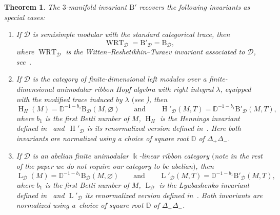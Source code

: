 \documentclass[10pt,a4paper]{amsart}
\newtheorem{theorem}{Theorem}
\numberwithin{equation}{section}
\numberwithin{theorem}{section}
\numberwithin{proposition}{section}
\numberwithin{definition}{section}
\numberwithin{lemma}{section}
\numberwithin{corollary}{section}
\numberwithin{remark}{section}
\numberwithin{example}{section}
\newcommand{\catd}{\mathcal{D}}
\newcommand{\FK}{{\Bbbk}}
\newcommand{\ThreeManInv}{\mathrm{B}}
\begin{document}
\begin{theorem} The $3$-manifold invariant $\ThreeManInv'$ recovers the following invariants as special cases:
 \begin{enumerate}\itemsep=0pt
 \item[$1.$] If $\catd$ is semisimple modular with the standard categorical trace, then
 \[\operatorname{WRT}_\catd=\ThreeManInv'_\catd=\ThreeManInv_\catd,\]
 where $\operatorname{WRT}_\catd$ is the Witten--Reshetikhin--Turaev
 invariant associated to $\catd$, see~{\rm \cite{RT, Tu}}.
 \item[$2.$] If $\catd$ is the category of finite-dimensional left
modules over a finite-dimensional unimodular ribbon Hopf algebra with right integral
$\lambda$, equipped with the modified trace induced by $\lambda$ $($see
{\rm\cite[{\it Theorem} 1]{BBG17b})}, then
\[
\operatorname{H}_H(M)=\mathbb{D}^{-1-b_1}\ThreeManInv_\catd(M,\varnothing) \qquad \text{and}\qquad \operatorname{H}'_\catd(M,T) =\mathbb{D}^{-1-b_1}\ThreeManInv'_\catd(M,T),
\]
where
$b_1$ is the first Betti number of $M$, $\operatorname{H}_H$ is the Hennings invariant defined in~{\rm \cite{H96}} and~$\operatorname{H}'_\catd$ is its renormalized version defined in~{\rm \cite{DRGPM18}}. Here both invariants are normalized using a choice of square root $\mathbb{D}$ of $\Delta_+\Delta_-$.
\item[$3.$] If $\catd$ is an abelian finite unimodular $\FK$-linear ribbon category $($note in the rest of the paper we do not require our category to be abelian$)$, then
\[\operatorname{L}_\catd(M)=\mathbb{D}^{-1-b_1}\ThreeManInv_\catd(M,\varnothing) \qquad\text{and}\qquad \operatorname{L}'_\catd(M,T) =\mathbb{D}^{-1-b_1}\ThreeManInv'_\catd(M,T),\]
where
$b_1$ is the first Betti number of $M$, $\operatorname{L}_\catd$ is the Lyubashenko invariant defined in~{\rm \cite{L94}} and $\operatorname{L}'_\catd$ its renormalized version defined in~{\rm \cite{DRGGPMR2022}}. Both invariants are normalized using a~choice of square root $\mathbb{D}$ of $\Delta_+\Delta_-$.
 \end{enumerate}
\end{theorem}
\end{document}

